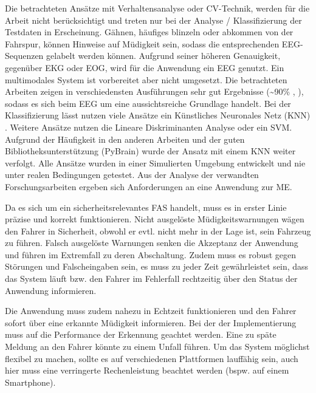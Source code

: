 \label{chap:requirements}
Die betrachteten Ansätze mit Verhaltensanalyse oder CV-Technik, werden für die Arbeit nicht berücksichtigt und treten nur bei der Analyse / Klassifizierung der Testdaten in Erscheinung. Gähnen, häufiges blinzeln oder abkommen von der Fahrspur, können Hinweise auf Müdigkeit sein, sodass die entsprechenden EEG-Sequenzen gelabelt werden können. 
Aufgrund seiner höheren Genauigkeit, gegenüber EKG oder EOG, wird für die Anwendung ein EEG genutzt. Ein multimodales System ist vorbereitet aber nicht umgesetzt. Die betrachteten Arbeiten zeigen in verschiedensten Ausführungen sehr gut Ergebnisse (\textasciitilde 90\% \cite{Lin05eeg-baseddrowsiness}, \cite{Subasi:2005:ARA:1707423.1707550}), sodass es sich beim EEG um eine aussichtsreiche Grundlage handelt. 
Bei der Klassifizierung lässt nutzen viele Ansätze ein Künstliches Neuronales Netz (KNN)\cite{wilson_890161}\cite{khalifa_893852}\cite{Subasi:2005:ARA:1707423.1707550} \cite{Vuckovic2002349}. Weitere Ansätze nutzen die Lineare Diskriminanten Analyse\cite{Vicente_6164509}\cite{Khushaba_5580017} oder ein SVM\cite{Park:2009:DDD:1667780.1667798}\cite{zhang_6513058}. Aufgrund der Häufigkeit in den anderen Arbeiten und der guten Bibliotheksunterstützung (PyBrain) wurde der Ansatz mit einem KNN weiter verfolgt. Alle Ansätze wurden in einer Simulierten Umgebung entwickelt und nie unter realen Bedingungen getestet. Aus der Analyse der verwandten Forschungsarbeiten ergeben sich Anforderungen an eine Anwendung zur {ME}. 

Da es sich um ein sicherheitsrelevantes {FAS} handelt, muss es in erster Linie präzise und korrekt funktionieren. Nicht ausgelöste Müdigkeitswarnungen wägen den Fahrer in Sicherheit, obwohl er evtl. nicht mehr in der Lage ist, sein Fahrzeug zu führen. Falsch ausgelöste Warnungen senken die Akzeptanz der Anwendung und führen im Extremfall zu deren   Abschaltung. Zudem muss es robust gegen Störungen und Falscheingaben sein, es muss zu jeder Zeit gewährleistet sein, dass das System läuft bzw. den Fahrer im Fehlerfall rechtzeitig über den Status der Anwendung informieren.

Die Anwendung muss zudem nahezu in Echtzeit funktionieren und den Fahrer sofort über eine erkannte Müdigkeit informieren. Bei der der Implementierung muss auf die Performance der Erkennung geachtet werden. Eine zu späte Meldung an den Fahrer könnte zu einem Unfall führen. Um das System möglichst flexibel zu machen, sollte es auf verschiedenen Plattformen lauffähig sein, auch hier muss eine verringerte Rechenleistung beachtet werden (bspw. auf einem Smartphone).

